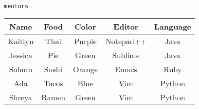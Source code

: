 \begin{center}
\texttt{mentors}\\
\begin{tabular}{|c|c|c|c|c|}
 \hline
 \textbf{Name} & \textbf{Food} & \textbf{Color} & \textbf{Editor} & \textbf{Language} \\
 \hline
  Kaitlyn & Thai & Purple & Notepad++ & Java \\
 \hline
  Jessica & Pie & Green & Sublime & Java \\
 \hline
  Sohum & Sushi & Orange & Emacs & Ruby \\
 \hline
  Ada & Tacos & Blue & Vim & Python \\
 \hline
  Shreya & Ramen & Green & Vim & Python \\
 \hline
\end{tabular}
\end{center}
